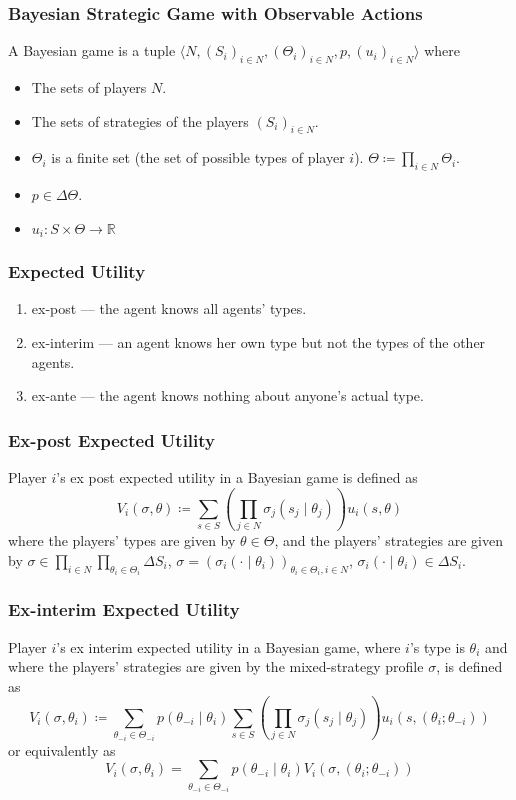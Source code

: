 \documentclass[UTF8,11pt,colorlinks,compress,openany]{beamer}%
\begin{document}
\begin{frame}\frametitle{Bayesian Strategic Game with Observable Actions}
\begin{definition}
	A Bayesian game is a tuple $\langle N,(S_i)_{i\in N},(\Theta_i)_{i\in N},p,(u_i)_{i\in N}\rangle$ where
	\begin{itemize}
		\item The sets of players $N$.
		\item The sets of strategies of the players $(S_i)_{i\in N}$.
		\item $\Theta_i$ is a finite set (the set of possible types of player $i$). $\Theta\coloneqq \prod\limits_{i\in N}\Theta_i$.
		\item $p\in\Delta\Theta$.
		\item $u_i: S\times\Theta\to\mathbb R$
	\end{itemize}
\end{definition}
\end{frame}

\begin{frame}\frametitle{Expected Utility}
\begin{enumerate}
	\item ex-post --- the agent knows all agents' types.
	\item ex-interim --- an agent knows her own type but not the types of the other agents.
	\item ex-ante --- the agent knows nothing about anyone's actual type.
\end{enumerate}
\end{frame}

\begin{frame}\frametitle{Ex-post Expected Utility}
\begin{definition}
	Player $i$'s ex post expected utility in a Bayesian game is defined as
	\[V_i(\sigma,\theta)\coloneqq \sum\limits_{s\in S}\left(\prod\limits_{j\in N}\sigma_j(s_j\mid\theta_j)\right)u_i(s,\theta)\]
	where the players' types are given by $\theta\in\Theta$, and the players' strategies are given by $\sigma\in\prod\limits_{i\in N}\prod\limits_{\theta_i\in\Theta_i}\Delta S_i$, $\sigma=(\sigma_i(\cdot\mid\theta_i))_{\theta_i\in\Theta_i,i\in N}$, $\sigma_i(\cdot\mid\theta_i)\in\Delta S_i$.
\end{definition}	
\end{frame}

\begin{frame}\frametitle{Ex-interim Expected Utility}
\begin{definition}
	Player $i$'s ex interim expected utility in a Bayesian game, where $i$'s type is $\theta_i$ and where the players' strategies are given by the mixed-strategy profile $\sigma$, is defined as
	\[V_i(\sigma,\theta_i)\coloneqq \sum\limits_{\theta_{-i}\in\Theta_{-i}}p(\theta_{-i}\mid\theta_i)\sum\limits_{s\in S}\left(\prod\limits_{j\in N}\sigma_j(s_j\mid\theta_j)\right)u_i(s,(\theta_i;\theta_{-i}))\]
	or equivalently as
	\[V_i(\sigma,\theta_i)=\sum\limits_{\theta_{-i}\in\Theta_{-i}}p(\theta_{-i}\mid\theta_i)V_i(\sigma,(\theta_i;\theta_{-i}))\]
\end{definition}
\end{frame}
\end{document}
